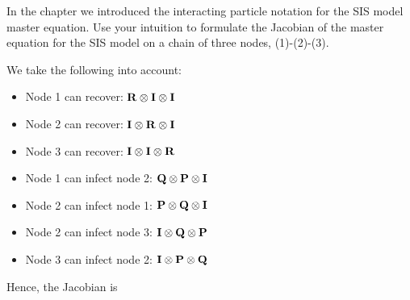 In the chapter we introduced the interacting particle notation for the SIS model master equation. Use your intuition to formulate the Jacobian of the master equation for the SIS model on a chain of three nodes, (1)-(2)-(3). 

\solution 
We take the following into account:
\begin{itemize}
\item Node 1 can recover: ${\bf R} \otimes {\bf I} \otimes {\bf I}$
\item Node 2 can recover: ${\bf I} \otimes {\bf R} \otimes {\bf I}$
\item Node 3 can recover: ${\bf I} \otimes {\bf I} \otimes {\bf R}$
\item Node 1 can infect node 2: ${\bf Q} \otimes {\bf P} \otimes {\bf I}$
\item Node 2 can infect node 1: ${\bf P} \otimes {\bf Q} \otimes {\bf I}$
\item Node 2 can infect node 3: ${\bf I} \otimes {\bf Q} \otimes {\bf P}$
\item Node 3 can infect node 2: ${\bf I} \otimes {\bf P} \otimes {\bf Q}$
\end{itemize}
Hence, the Jacobian is 



